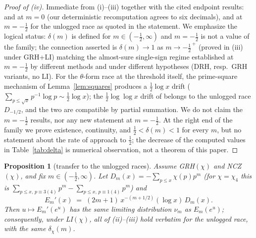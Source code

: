 \documentclass[11pt]{article}
\newtheorem{proposition}{Proposition}
\begin{document}
\begin{proof}[Proof of (iv)]
Immediate from (i)--(iii) together with the cited endpoint results:
\cite{RS94} and \cite{FM13} at $m=0$ (our deterministic recomputation
agrees to six decimals), and \cite{AK23,Sheth24,Hay25} at $m=-\tfrac12$
for the unlogged race as quoted in the statement. We emphasize the
logical status: $\delta(m)$ is defined for $m\in(-\tfrac12,\infty)$ and
$m=-\tfrac12$ is not a value of the family; the connection asserted is
$\delta(m)\to1$ as $m\to-\tfrac12^{\,+}$ (proved in (iii) under
GRH+LI) matching the almost-sure single-sign regime established at
$m=-\tfrac12$ by different methods and under different hypotheses
(DRH, resp.\ GRH variants, no LI). For the $\theta$-form race at the
threshold itself, the prime-square mechanism of
Lemma~\ref{lem:squares} produces a $\tfrac12\log x$ drift
($\sum_{p\le\sqrt x}p^{-1}\log p\sim\tfrac12\log x$); the
$\tfrac12\log\log x$ drift of \cite{AK23,Sheth24} belongs to the
unlogged race $D_{-1/2}$, and the two are compatible by partial
summation. We do not claim the $m=-\tfrac12$ results, nor any new
statement at $m=-\tfrac12$. At the right end of the family we prove
existence, continuity, and $\tfrac12<\delta(m)<1$ for every $m$, but
no statement about the rate of approach to $\tfrac12$; the decrease of
the computed values in Table~\ref{tab:delta} is numerical observation,
not a theorem of this paper.
\end{proof}

\begin{proposition}[transfer to the unlogged races]\label{prop:unlogged}
Assume GRH$(\chi)$ and NCZ$(\chi)$, and fix $m\in(-\tfrac12,\infty)$.
Let
$D_m(x)=-\sum_{p\le x}\chi(p)p^m$ (for $\chi=\chi_4$ this is
$\sum_{p\le x,\,p\equiv3(4)}p^m-\sum_{p\le x,\,p\equiv1(4)}p^m$)
and
\[
E_m'(x)\;=\;(2m+1)\,x^{-(m+1/2)}(\log x)\,D_m(x).
\]
Then $u\mapsto E_m'(e^u)$ has the \emph{same} limiting distribution
$\nu_m$ as $E_m(e^u)$; consequently, under LI$(\chi)$, all of
(ii)--(iii) hold verbatim for the unlogged race, with the same
$\delta_\chi(m)$.
\end{proposition}
\end{document}
